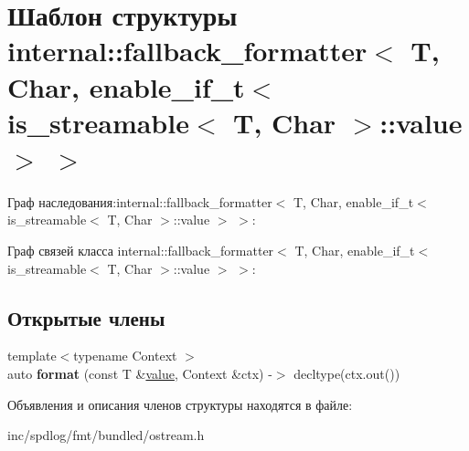 \hypertarget{structinternal_1_1fallback__formatter_3_01T_00_01Char_00_01enable__if__t_3_01is__streamable_3_0105289f9fbc16beec2647eb32164f6572}{}\section{Шаблон структуры internal\+:\+:fallback\+\_\+formatter$<$ T, Char, enable\+\_\+if\+\_\+t$<$ is\+\_\+streamable$<$ T, Char $>$\+:\+:value $>$ $>$}
\label{structinternal_1_1fallback__formatter_3_01T_00_01Char_00_01enable__if__t_3_01is__streamable_3_0105289f9fbc16beec2647eb32164f6572}


Граф наследования\+:internal\+:\+:fallback\+\_\+formatter$<$ T, Char, enable\+\_\+if\+\_\+t$<$ is\+\_\+streamable$<$ T, Char $>$\+:\+:value $>$ $>$\+:


Граф связей класса internal\+:\+:fallback\+\_\+formatter$<$ T, Char, enable\+\_\+if\+\_\+t$<$ is\+\_\+streamable$<$ T, Char $>$\+:\+:value $>$ $>$\+:
\subsection*{Открытые члены}
\begin{DoxyCompactItemize}
\item 
\mbox{\label{structinternal_1_1fallback__formatter_3_01T_00_01Char_00_01enable__if__t_3_01is__streamable_3_0105289f9fbc16beec2647eb32164f6572_addbdbeca2c734dc6de9180b597aa190d}} 
{\footnotesize template$<$typename Context $>$ }\\auto {\bfseries format} (const T \&\hyperlink{classinternal_1_1value}{value}, Context \&ctx) -\/$>$ decltype(ctx.\+out())
\end{DoxyCompactItemize}


Объявления и описания членов структуры находятся в файле\+:\begin{DoxyCompactItemize}
\item 
inc/spdlog/fmt/bundled/ostream.\+h\end{DoxyCompactItemize}
